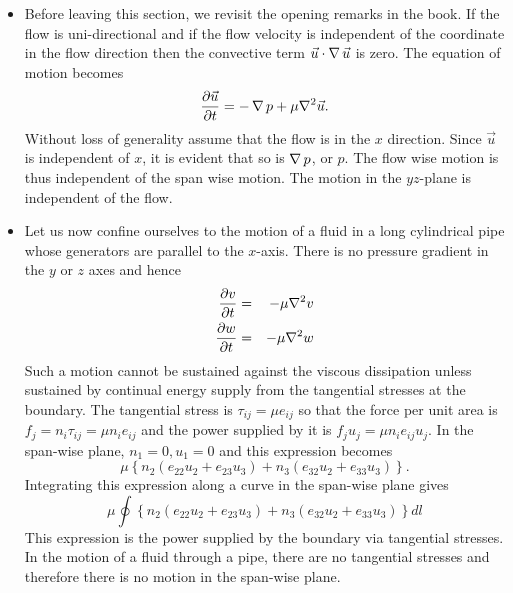 \begin{itemize}
\item Before leaving this section, we revisit the opening remarks in the book. If the flow is uni-directional and
if the flow velocity is independent of the coordinate in the flow direction then the convective term $\vec{u}\cdot
\operatorname{\nabla}{\vec{u}}$ is zero. The equation of motion becomes
\[
\frac{\partial{\vec{u}}}{\partial{t}} = -\operatorname{\nabla}{p} + \mu\nabla^2\vec{u}.
\]
Without loss of generality assume that the flow is in the $x$ direction. Since $\vec{u}$ is independent of $x$, it is
evident that so is $\operatorname{\nabla}{p}$, or $p$. The flow wise motion is thus independent of the span wise motion. The motion in
the $yz$-plane is independent of the flow. 

\item Let us now confine ourselves to the motion of a fluid in a long cylindrical pipe whose generators are parallel
to the $x$-axis. There is no pressure gradient in the $y$ or $z$ axes and hence
\begin{eqnarray*}
\frac{\partial{v}}{\partial{t}} &=& -\mu\nabla^2 v \\
\frac{\partial{w}}{\partial{t}} &=& -\mu\nabla^2 w 
\end{eqnarray*}
Such a motion cannot be sustained against the viscous dissipation unless sustained by continual energy supply from
the tangential stresses at the boundary. The tangential stress is $\tau_{ij} = \mu e_{ij}$ so that the force per unit
area is $f_j = n_i\tau_{ij} = \mu n_i e_{ij}$ and the power supplied by it is $f_j u_j = \mu n_i e_{ij} u_j$. In the
span-wise plane, $n_1 = 0, u_1 = 0$ and this expression becomes
\[
\mu\left\{n_2 (e_{22}u_2 + e_{23}u_3) + n_3(e_{32}u_2 + e_{33}u_3)\right\}.
\]
Integrating this expression along a curve in the span-wise plane gives
\[
\mu\oint\left\{n_2 (e_{22}u_2 + e_{23}u_3) + n_3(e_{32}u_2 + e_{33}u_3)\right\}dl
\]
This expression is the power supplied by the boundary via tangential stresses. In the motion of a fluid through a
pipe, there are no tangential stresses and therefore there is no motion in the span-wise plane.
\end{itemize}

